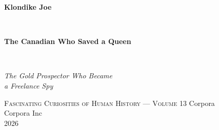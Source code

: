 \clearpage
\vspace*{1.5in}
\begin{center}
  \begin{minipage}{\textwidth}
    \centering
    \Huge\bfseries
    \linespread{1.25}\selectfont
    Klondike Joe
  \end{minipage}
  \\[1em]
  {\LARGE\bfseries The Canadian Who Saved a Queen\par}
  \\[3em]
  {\Large\itshape\linespread{1.3}\selectfont
  The Gold Prospector Who Became\\
  a Freelance Spy\par}
  \vspace{2em}
  {\small\scshape Fascinating Curiosities of Human History — Volume 13}
  \vfill
  {\large Corpora}
  \\[1em]
  {\large Corpora Inc}
  \\[1em]
  {\large 2026}
\end{center}
\clearpage
